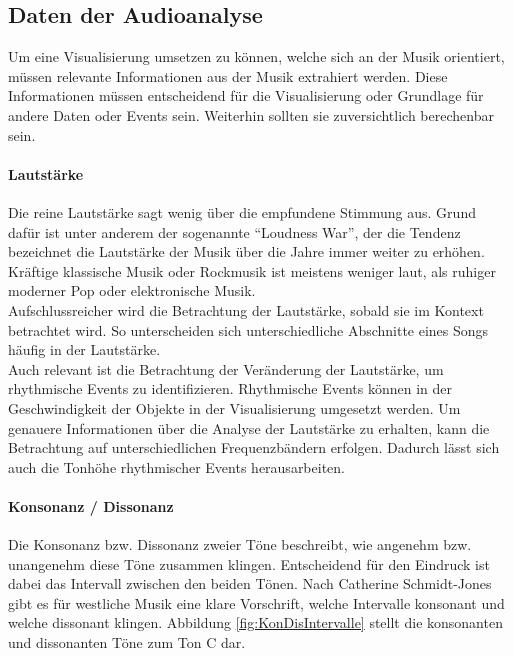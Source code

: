 \documentclass[11pt,a4paper]{article}
\begin{document}
\subsection{Daten der Audioanalyse}
Um eine Visualisierung umsetzen zu können, welche sich an der Musik orientiert, müssen relevante Informationen aus der Musik extrahiert werden. Diese Informationen müssen entscheidend für die Visualisierung oder Grundlage für andere Daten oder Events sein. Weiterhin sollten sie zuversichtlich berechenbar sein.

\paragraph{Lautstärke}
Die reine Lautstärke sagt wenig über die empfundene Stimmung aus. Grund dafür ist unter anderem der sogenannte ``Loudness War'', der die Tendenz bezeichnet die Lautstärke der Musik über die Jahre immer weiter zu erhöhen\cite{683ea11abc74c43c6680cd4c08dc538caee546575b59c2f40d70033cf3389ec8}. Kräftige klassische Musik oder  Rockmusik ist meistens weniger laut, als ruhiger moderner Pop oder elektronische Musik.\\
Aufschlussreicher wird die Betrachtung der Lautstärke, sobald sie im Kontext betrachtet wird. So unterscheiden sich unterschiedliche Abschnitte eines Songs häufig in der Lautstärke.\\
Auch relevant ist die Betrachtung der Veränderung der Lautstärke, um rhythmische Events zu identifizieren. Rhythmische Events können in der Geschwindigkeit der Objekte in der Visualisierung umgesetzt werden. Um genauere Informationen über die Analyse der Lautstärke zu erhalten, kann die Betrachtung auf unterschiedlichen Frequenzbändern erfolgen. Dadurch lässt sich auch die Tonhöhe rhythmischer Events herausarbeiten.

\newpage
\paragraph{Konsonanz / Dissonanz}
Die Konsonanz bzw. Dissonanz zweier Töne beschreibt, wie angenehm bzw. unangenehm diese Töne zusammen klingen. Entscheidend für den Eindruck ist dabei das Intervall zwischen den beiden Tönen. Nach Catherine Schmidt-Jones \cite{89a5aac0af37ff45f55cd59468ed3b0a5f30cbb229bb691b7970477c14dbe1af} gibt es für westliche Musik eine klare Vorschrift, welche Intervalle konsonant und welche dissonant klingen. Abbildung \ref{fig:KonDisIntervalle} stellt die konsonanten und dissonanten Töne zum Ton C dar.
\end{document}
